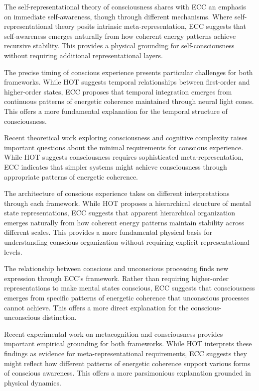 The self-representational theory of consciousness \cite{Kriegel2009} shares with ECC an emphasis on immediate self-awareness, though through different mechanisms. Where self-representational theory posits intrinsic meta-representation, ECC suggests that self-awareness emerges naturally from how coherent energy patterns achieve recursive stability. This provides a physical grounding for self-consciousness without requiring additional representational layers.

The precise timing of conscious experience \cite{Gennaro2012} presents particular challenges for both frameworks. While HOT suggests temporal relationships between first-order and higher-order states, ECC proposes that temporal integration emerges from continuous patterns of energetic coherence maintained through neural light cones. This offers a more fundamental explanation for the temporal structure of consciousness.

Recent theoretical work exploring consciousness and cognitive complexity \cite{LeDoux2017} raises important questions about the minimal requirements for conscious experience. While HOT suggests consciousness requires sophisticated meta-representation, ECC indicates that simpler systems might achieve consciousness through appropriate patterns of energetic coherence.

The architecture of conscious experience \cite{Rosenthal2005} takes on different interpretations through each framework. While HOT proposes a hierarchical structure of mental state representations, ECC suggests that apparent hierarchical organization emerges naturally from how coherent energy patterns maintain stability across different scales. This provides a more fundamental physical basis for understanding conscious organization without requiring explicit representational levels.

The relationship between conscious and unconscious processing \cite{Armstrong1968} finds new expression through ECC's framework. Rather than requiring higher-order representations to make mental states conscious, ECC suggests that consciousness emerges from specific patterns of energetic coherence that unconscious processes cannot achieve. This offers a more direct explanation for the conscious-unconscious distinction.

Recent experimental work on metacognition and consciousness \cite{Brown2019} provides important empirical grounding for both frameworks. While HOT interprets these findings as evidence for meta-representational requirements, ECC suggests they might reflect how different patterns of energetic coherence support various forms of conscious awareness. This offers a more parsimonious explanation grounded in physical dynamics.

